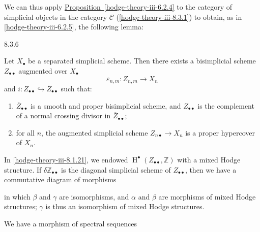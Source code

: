   We can thus apply \hyperref[hodge-theory-iii-6.2.4]{Proposition~\ref*{hodge-theory-iii-6.2.4}} to the category of simplicial objects in the category \(\mathscr {C}\) (\cref{hodge-theory-iii-8.3.1}) to obtain, as in \cref{hodge-theory-iii-6.2.5}, the following lemma:\begin{lemma}{8.3.6}\label{hodge-theory-iii-8.3.6}\skipsinglepar\par{}Let \(X_\bullet \) be a separated simplicial scheme.
    Then there exists a bisimplicial scheme \(Z_{\bullet \bullet }\) augmented over \(X_\bullet \)
    \[       \varepsilon _{n,m}       \colon  Z_{n,m}       \to  X_n     \]
    and \(i\colon  Z_{\bullet \bullet }\hookrightarrow \overline {Z}_{\bullet \bullet }\) such that:

    
 \begin{enumerate}
      
 \item[(a)]
        \(\overline {Z}_{\bullet \bullet }\) is a smooth and proper bisimplicial scheme, and \(Z_{\bullet \bullet }\) is the complement of a normal crossing divisor in \(\overline {Z}_{\bullet \bullet }\);
      

      
 \item[(b)]
        for all \(n\), the augmented simplicial scheme \(Z_{n\bullet }\to  X_n\) is a proper hypercover of \(X_n\).
      

    \end{enumerate}\end{lemma}\par{}In \cref{hodge-theory-iii-8.1.21}, we endowed \(\operatorname {H}^\bullet (Z_{\bullet \bullet },\mathbb {Z})\) with a mixed Hodge structure.
  If \(\delta \mathbb {Z}_{\bullet \bullet }\) is the diagonal simplicial scheme of \(Z_{\bullet \bullet }\), then we have a commutative diagram of morphisms
  

  
  in which \(\beta \) and \(\gamma \) are isomorphisms, and \(\alpha \) and \(\beta \) are morphisms of mixed Hodge structures;
  \(\gamma \) is thus an isomorphism of mixed Hodge structures.\par{}We have a morphism of spectral sequences
  
